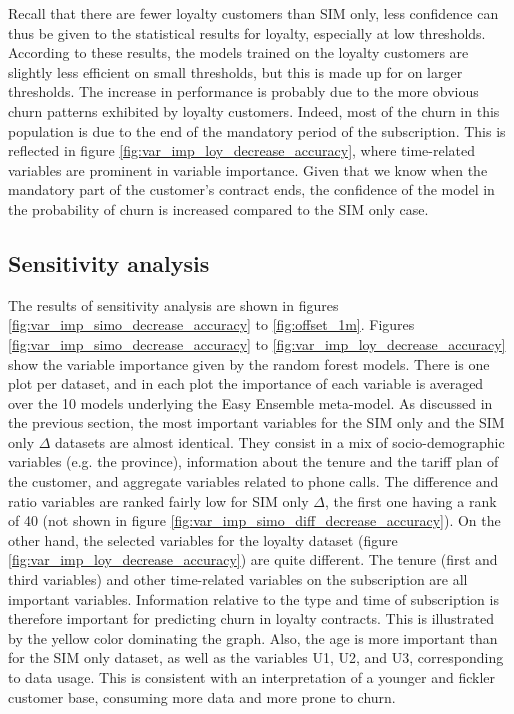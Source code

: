 Recall that there are fewer loyalty customers than SIM only, less confidence can
thus be given to the statistical results for loyalty, especially at low
thresholds. According to these results, the models trained on the loyalty
customers are slightly less efficient on small thresholds, but this is made up
for on larger thresholds. The increase in performance is probably due to the
more obvious churn patterns exhibited by loyalty customers. Indeed, most of the
churn in this population is due to the end of the mandatory period of the
subscription. This is reflected in figure
\ref{fig:var_imp_loy_decrease_accuracy}, where time-related variables are
prominent in variable importance. Given that we know when the mandatory part of
the customer's contract ends, the confidence of the model in the probability of
churn is increased compared to the SIM only case.

\subsection{Sensitivity analysis}

The results of sensitivity analysis are shown in figures
\ref{fig:var_imp_simo_decrease_accuracy} to \ref{fig:offset_1m}. Figures
\ref{fig:var_imp_simo_decrease_accuracy} to
\ref{fig:var_imp_loy_decrease_accuracy} show the variable importance given by
the random forest models. There is one plot per dataset, and in each plot the
importance of each variable is averaged over the 10 models underlying the Easy
Ensemble meta-model. As discussed in the previous section, the most important
variables for the SIM only and the SIM only $\Delta$ datasets are almost
identical. They consist in a mix of socio-demographic variables (e.g. the
province), information about the tenure and the tariff plan of the customer, and
aggregate variables related to phone calls. The difference and ratio variables
are ranked fairly low for SIM only $\Delta$, the first one having a rank of 40
(not shown in figure \ref{fig:var_imp_simo_diff_decrease_accuracy}). On the
other hand, the selected variables for the loyalty dataset (figure
\ref{fig:var_imp_loy_decrease_accuracy}) are quite different. The tenure (first
and third variables) and other time-related variables on the subscription are
all important variables. Information relative to the type and time of
subscription is therefore important for predicting churn in loyalty contracts.
This is illustrated by the yellow color dominating the graph. Also, the age is
more important than for the SIM only dataset, as well as the variables U1, U2,
and U3, corresponding to data usage. This is consistent with an interpretation
of a younger and fickler customer base, consuming more data and more prone to
churn.

